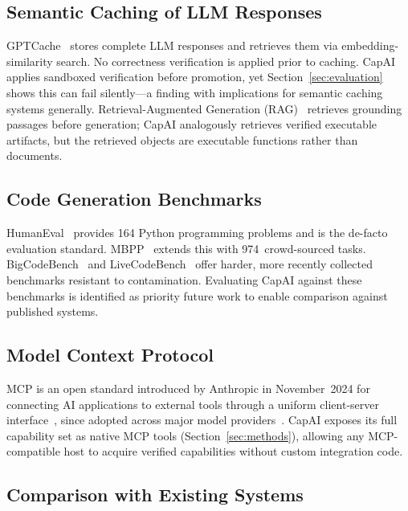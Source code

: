 \documentclass[conference]{IEEEtran}
\begin{document}
\subsection{Semantic Caching of LLM Responses}

GPTCache~\cite{gptcache2023} stores complete LLM responses and retrieves
them via embedding-similarity search.
No correctness verification is applied prior to caching.
CapAI applies sandboxed verification before promotion, yet
Section~\ref{sec:evaluation} shows this can fail silently---a finding
with implications for semantic caching systems generally.
Retrieval-Augmented Generation (RAG)~\cite{lewis2020rag} retrieves
grounding passages before generation; CapAI analogously retrieves
verified executable artifacts, but the retrieved objects are executable
functions rather than documents.

\subsection{Code Generation Benchmarks}

HumanEval~\cite{chen2021humaneval} provides 164 Python programming
problems and is the de-facto evaluation standard.
MBPP~\cite{austin2021mbpp} extends this with 974~crowd-sourced tasks.
BigCodeBench~\cite{zhuo2024bigcodebench} and
LiveCodeBench~\cite{jain2024livecodebench} offer harder, more recently
collected benchmarks resistant to contamination.
Evaluating CapAI against these benchmarks is identified as priority future
work to enable comparison against published systems.

\subsection{Model Context Protocol}

MCP is an open standard introduced by Anthropic in November~2024 for
connecting AI applications to external tools through a uniform
client-server interface~\cite{anthropic_mcp2024,mcp_spec2025}, since
adopted across major model providers~\cite{jones2025mcp}.
CapAI exposes its full capability set as native MCP tools
(Section~\ref{sec:methods}), allowing any MCP-compatible host to acquire
verified capabilities without custom integration code.

\subsection{Comparison with Existing Systems}
\end{document}
